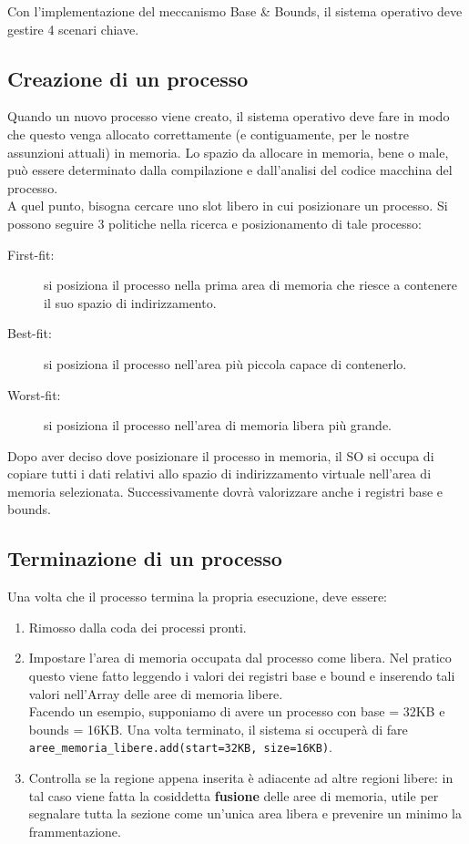 \documentclass[12pt]{report}
\begin{document}
	Con l'implementazione del meccanismo Base \& Bounds, il sistema operativo deve gestire 4 scenari chiave.
	
	\subsection{Creazione di un processo}
	Quando un nuovo processo viene creato, il sistema operativo deve fare in modo che questo venga allocato correttamente (e contiguamente, per le nostre assunzioni attuali) in memoria. Lo spazio da allocare in memoria, bene o male, può essere determinato dalla compilazione e dall'analisi del codice macchina del processo.\\
	A quel punto, bisogna cercare uno slot libero in cui posizionare un processo. Si possono seguire 3 politiche nella ricerca e posizionamento di tale processo:
	\begin{description}
		\item [First-fit:] si posiziona il processo nella prima area di memoria che riesce a contenere il suo spazio di indirizzamento.
		
		\item[Best-fit:] si posiziona il processo nell'area più piccola capace di contenerlo.
		
		\item[Worst-fit:] si posiziona il processo nell'area di memoria libera più grande.
	\end{description}
	Dopo aver deciso dove posizionare il processo in memoria, il SO si occupa di copiare tutti i dati relativi allo spazio di indirizzamento virtuale nell'area di memoria selezionata. Successivamente dovrà valorizzare anche i registri base e bounds.
	
	\subsection{Terminazione di un processo}
	Una volta che il processo termina la propria esecuzione, deve essere:
	\begin{enumerate}
		\item Rimosso dalla coda dei processi pronti.
		
		\item Impostare l'area di memoria occupata dal processo come libera. Nel pratico questo viene fatto leggendo i valori dei registri base e bound e inserendo tali valori nell'Array delle aree di memoria libere.\\
		Facendo un esempio, supponiamo di avere un processo con base = 32KB e bounds = 16KB. Una volta terminato, il sistema si occuperà di fare \texttt{aree\_memoria\_libere.add(start=32KB, size=16KB)}.
		
		\item Controlla se la regione appena inserita è adiacente ad altre regioni libere: in tal caso viene fatta la cosiddetta \textbf{fusione} delle aree di memoria, utile per segnalare tutta la sezione come un'unica area libera e prevenire un minimo la frammentazione.
	\end{enumerate}
	
\end{document}

